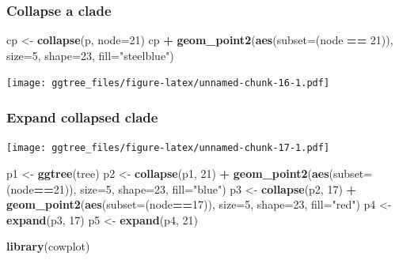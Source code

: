 \documentclass[]{article}
\newenvironment{Shaded}{\begin{snugshade}}{\end{snugshade}}
\newcommand{\KeywordTok}[1]{\textcolor[rgb]{0.13,0.29,0.53}{\textbf{#1}}}
\newcommand{\DataTypeTok}[1]{\textcolor[rgb]{0.13,0.29,0.53}{#1}}
\newcommand{\DecValTok}[1]{\textcolor[rgb]{0.00,0.00,0.81}{#1}}
\newcommand{\StringTok}[1]{\textcolor[rgb]{0.31,0.60,0.02}{#1}}
\newcommand{\OperatorTok}[1]{\textcolor[rgb]{0.81,0.36,0.00}{\textbf{#1}}}
\newcommand{\NormalTok}[1]{#1}
\begin{document}
\subsubsection{Collapse a clade}\label{collapse-a-clade}

\begin{Shaded}
\begin{Highlighting}[]
\NormalTok{cp <-}\StringTok{ }\KeywordTok{collapse}\NormalTok{(p, }\DataTypeTok{node=}\DecValTok{21}\NormalTok{)}
\NormalTok{cp }\OperatorTok{+}\StringTok{ }\KeywordTok{geom_point2}\NormalTok{(}\KeywordTok{aes}\NormalTok{(}\DataTypeTok{subset=}\NormalTok{(node }\OperatorTok{==}\StringTok{ }\DecValTok{21}\NormalTok{)), }\DataTypeTok{size=}\DecValTok{5}\NormalTok{, }\DataTypeTok{shape=}\DecValTok{23}\NormalTok{, }\DataTypeTok{fill=}\StringTok{"steelblue"}\NormalTok{)}
\end{Highlighting}
\end{Shaded}

\texttt{[image: ggtree\_files/figure-latex/unnamed-chunk-16-1.pdf]}

\subsubsection{Expand collapsed clade}\label{expand-collapsed-clade}

\begin{Shaded}
\end{Shaded}

\texttt{[image: ggtree\_files/figure-latex/unnamed-chunk-17-1.pdf]}

\begin{Shaded}
\begin{Highlighting}[]
\NormalTok{p1 <-}\StringTok{ }\KeywordTok{ggtree}\NormalTok{(tree)}
\NormalTok{p2 <-}\StringTok{ }\KeywordTok{collapse}\NormalTok{(p1, }\DecValTok{21}\NormalTok{) }\OperatorTok{+}\StringTok{ }\KeywordTok{geom_point2}\NormalTok{(}\KeywordTok{aes}\NormalTok{(}\DataTypeTok{subset=}\NormalTok{(node}\OperatorTok{==}\DecValTok{21}\NormalTok{)), }\DataTypeTok{size=}\DecValTok{5}\NormalTok{, }\DataTypeTok{shape=}\DecValTok{23}\NormalTok{, }\DataTypeTok{fill=}\StringTok{"blue"}\NormalTok{)}
\NormalTok{p3 <-}\StringTok{ }\KeywordTok{collapse}\NormalTok{(p2, }\DecValTok{17}\NormalTok{) }\OperatorTok{+}\StringTok{ }\KeywordTok{geom_point2}\NormalTok{(}\KeywordTok{aes}\NormalTok{(}\DataTypeTok{subset=}\NormalTok{(node}\OperatorTok{==}\DecValTok{17}\NormalTok{)), }\DataTypeTok{size=}\DecValTok{5}\NormalTok{, }\DataTypeTok{shape=}\DecValTok{23}\NormalTok{, }\DataTypeTok{fill=}\StringTok{"red"}\NormalTok{)}
\NormalTok{p4 <-}\StringTok{ }\KeywordTok{expand}\NormalTok{(p3, }\DecValTok{17}\NormalTok{)}
\NormalTok{p5 <-}\StringTok{ }\KeywordTok{expand}\NormalTok{(p4, }\DecValTok{21}\NormalTok{)}

\KeywordTok{library}\NormalTok{(cowplot)}
\end{Highlighting}
\end{Shaded}
\end{document}
